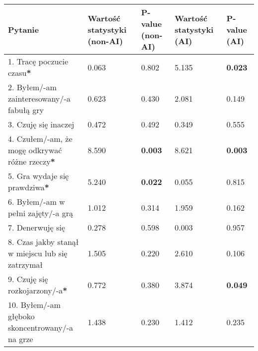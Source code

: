 \begin{table}[h!]
    \begin{center}
        \begin{tabular}{|m{10em}|m{5em}|m{5em}|m{5em}|m{5em}|}
            \hline
            Pytanie                                                           & Wartość statystyki (non-AI) & P-value (non-AI) & Wartość statystyki (AI) & P-value (AI)   \\
            \hline
            1. Tracę poczucie czasu\textbf{*}                                 & 0.063                       & 0.802            & 5.135                   & \textbf{0.023} \\
            2. Byłem/-am \newline zainteresowany/-a fabułą gry                & 0.623                       & 0.430            & 2.081                   & 0.149          \\
            3. Czuję się inaczej                                              & 0.472                       & 0.492            & 0.349                   & 0.555          \\
            4. Czułem/-am, że mogę odkrywać różne rzeczy\textbf{*}            & 8.590                       & \textbf{0.003}   & 8.621                   & \textbf{0.003} \\
            5. Gra wydaje się prawdziwa\textbf{*}                             & 5.240                       & \textbf{0.022}   & 0.055                   & 0.815          \\
            6. Byłem/-am \newline w pełni zajęty/-a grą                       & 1.012                       & 0.314            & 1.959                   & 0.162          \\
            7. Denerwuję się                                                  & 0.278                       & 0.598            & 0.003                   & 0.957          \\
            8. Czas jakby stanął w miejscu lub się zatrzymał                  & 1.505                       & 0.220            & 2.610                   & 0.106          \\
            9. Czuję się \newline rozkojarzony/-a\textbf{*}                   & 0.772                       & 0.380            & 3.874                   & \textbf{0.049} \\
            10. Byłem/-am głęboko \newline skoncentrowany/-a \newline na grze & 1.438                       & 0.230            & 1.412                   & 0.235          \\

\end{tabular}
\end{center}
\end{table}
